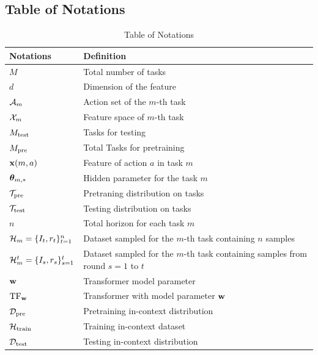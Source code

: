 \documentclass[10pt]{article}
\theoremstyle{plain}
\theoremstyle{definition}
\theoremstyle{remark}
\begin{document}
\subsection{Table of Notations}
\label{table-notations}
\begin{table}[!tbh]
    \centering
    \begin{tabular}{|p{10em}|p{28em}|}
        \hline\textbf{Notations} & \textbf{Definition} \\\hline
        $M$ & Total number of tasks \\\hline
        $d$ & Dimension of the feature \\\hline
        $\mathcal{A}_m$  & Action set of the $m$-th task \\\hline
        $\mathcal{X}_m$  &Feature space of $m$-th task \\\hline
        $M_{\text{test}}$  & Tasks for testing\\\hline
        $M_{\text{pre}}$  & Total Tasks for pretraining\\\hline
        $\mathbf{x}(m, a)$  & Feature of action $a$ in task $m$\\\hline
        $\boldsymbol{\theta}_{m,*}$  & Hidden parameter for the task $m$\\\hline
        $\mathcal{T}_{\text{pre}}$  & Pretraning distribution on tasks\\\hline
        $\mathcal{T}_{\text{test}}$  & Testing distribution on tasks\\\hline
        $n$  & Total horizon for each task $m$\\\hline
        $\mathcal{H}_m  = \{I_t, r_t\}_{t=1}^n$  & Dataset sampled for the $m$-th task containing $n$ samples\\\hline
        $\mathcal{H}^t_m = \{I_s, r_s\}_{s=1}^t$  & Dataset sampled for the $m$-th task containing samples from round $s=1$ to $t$\\\hline
        $\mathbf{w}$ & Transformer model parameter\\\hline
        $\mathrm{TF}_{\mathbf{w}}$ & Transformer with model parameter $\mathbf{w}$\\\hline
        $\mathcal{D}_{\text{pre}}$  & Pretraining in-context distribution\\\hline
        $\mathcal{H}_{\text{train}}$  & Training in-context dataset\\\hline
        $\mathcal{D}_{\text{test}}$  & Testing in-context distribution\\\hline
    \end{tabular}
    \vspace{1em}
    \caption{Table of Notations}
    \label{tab:my_label}
\end{table}
\end{document}
